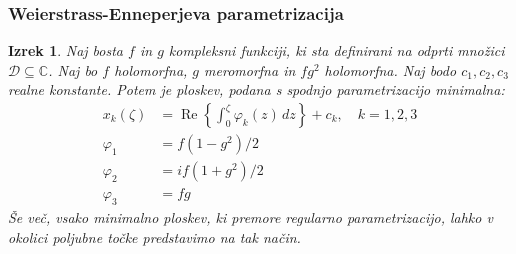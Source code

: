 \documentclass[10pt]{beamer}
\theoremstyle{definition}
\theoremstyle{remark}
\theoremstyle{plain}
\newtheorem{izrek}[definicija]{Izrek}
\numberwithin{equation}{section}  %
\begin{document}
\begin{frame}
    \frametitle{Weierstrass-Enneperjeva parametrizacija}

    \begin{izrek}
        Naj bosta $f$ in $g$ kompleksni funkciji, ki sta definirani na odprti množici $\mathcal{D}\subseteq\mathbb{C}$. Naj bo $f$ holomorfna, $g$ meromorfna in $f g^2$ holomorfna. Naj bodo $c_1, c_2, c_3$ realne konstante. Potem je ploskev, podana s spodnjo parametrizacijo minimalna:
        $$
        \begin{aligned}
            x_k(\zeta) & =\operatorname{Re}\left\{\int_0^\zeta \varphi_k(z) \, dz\right\}+c_k, \quad k=1,2,3 \\
            \varphi_1 & =f\left(1-g^2\right) / 2 \\
            \varphi_2 & =i f\left(1+g^2\right) / 2 \\
            \varphi_3 & =f g
        \end{aligned}
        $$
        Še več, vsako minimalno ploskev, ki premore regularno parametrizacijo, lahko v okolici poljubne točke predstavimo na tak način.
    \end{izrek}
\end{frame}
\end{document}
